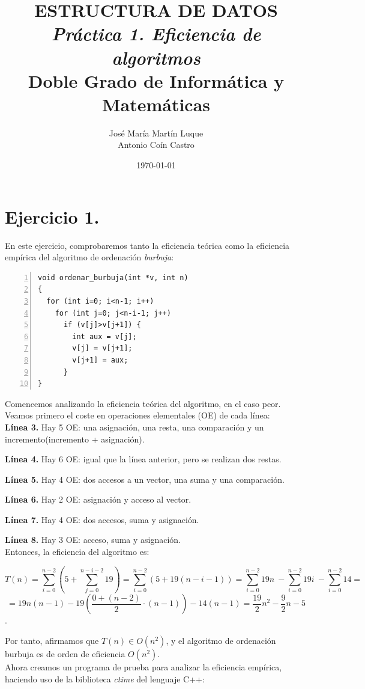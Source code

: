 \documentclass[11pt,a4paper]{article}
\title{\textbf{ESTRUCTURA DE DATOS}\\
	   \textit{Práctica 1. Eficiencia de algoritmos}\\
	   \large \vspace{0.25em} Doble Grado de Informática y Matemáticas}
\author{José María Martín Luque\\ Antonio Coín Castro}
\date{\today}
\begin{document}
\maketitle

\section*{Ejercicio 1.}
En este ejercicio, comprobaremos tanto la eficiencia teórica como la eficiencia empírica del algoritmo de ordenación \emph{burbuja}:

\begin{lstlisting}[numbers=left]
void ordenar_burbuja(int *v, int n)
{
  for (int i=0; i<n-1; i++)
    for (int j=0; j<n-i-1; j++)
      if (v[j]>v[j+1]) {
        int aux = v[j];
        v[j] = v[j+1];
        v[j+1] = aux;
      }
}
\end{lstlisting}

Comencemos analizando la eficiencia teórica del algoritmo, en el caso peor. Veamos primero el coste en operaciones elementales (OE) de cada línea:\\

\textbf{Línea 3.} Hay 5 OE: una asignación, una resta, una comparación y un incremento(incremento + asignación).

\textbf{Línea 4.} Hay 6 OE: igual que la línea anterior, pero se realizan dos restas.

\textbf{Línea 5.} Hay 4 OE: dos accesos a un vector, una suma y una comparación.

\textbf{Línea 6.} Hay 2 OE: asignación y acceso al vector.

\textbf{Línea 7.} Hay 4 OE: dos accesos, suma y asignación.

\textbf{Línea 8.} Hay 3 OE: acceso, suma y asignación.\\

Entonces, la eficiencia del algoritmo es:

$$ T(n) = \sum_{i=0}^{n-2} \left( 5 + \sum_{j=0}^{n-i-2} 19 \right) = \sum_{i=0}^{n-2} \left( 5 + 19(n-i-1) \right) = \sum_{i=0}^{n-2} 19n\ - \sum_{i=0}^{n-2} 19i\ - \sum_{i=0}^{n-2} 14 = $$ $$ = 19n(n-1) - 19 \left( \frac{0 + (n-2)}{2} \cdot (n-1) \right) - 14(n-1) = \frac{19}{2}n^2 - \frac{9}{2} n - 5$$.

Por tanto, afirmamos que $T(n) \in O(n^2)$, y el algoritmo de ordenación burbuja es de orden de eficiencia $O(n^2)$.\\

Ahora creamos un programa de prueba para analizar la eficiencia empírica, haciendo uso de la biblioteca \emph{ctime} del lenguaje C++:
\end{document}
